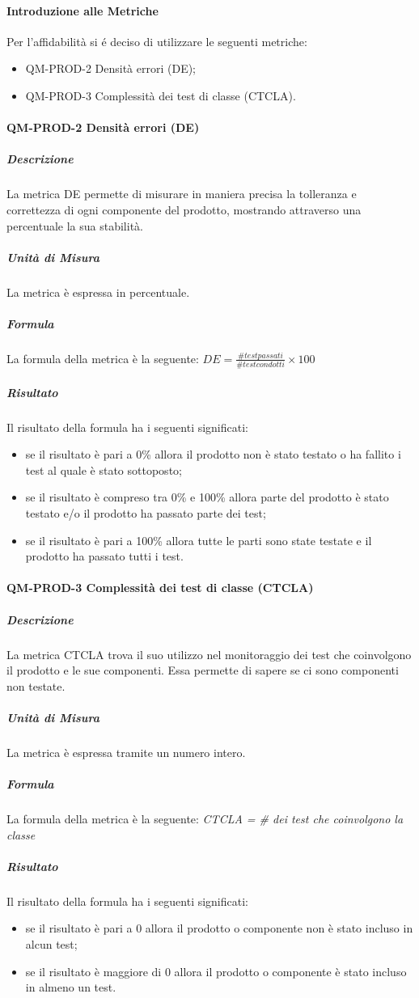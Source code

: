 		\paragraph{Introduzione alle Metriche}
			Per l'affidabilità si é deciso di utilizzare le seguenti metriche:
			\begin{itemize}
				\item QM-PROD-2 Densità errori (DE);
				\item QM-PROD-3 Complessità dei test di classe (CTCLA).
			\end{itemize}
		\paragraph{ QM-PROD-2 Densità errori (DE)}
			\subparagraph{Descrizione}
				La metrica DE permette di misurare in maniera precisa la tolleranza e correttezza di ogni componente del prodotto, mostrando attraverso una percentuale la sua stabilità.
			\subparagraph{Unità di Misura}
				La metrica è espressa in percentuale.
			\subparagraph{Formula}
				La formula della metrica è la seguente:
				\(DE = \frac{\# test passati}{\# test condotti}\times100\)
			\subparagraph{Risultato}
				Il risultato della formula ha i seguenti significati:
				\begin{itemize}
					\item se il risultato è pari a 0\% allora il prodotto non è stato testato o ha fallito i test al quale è stato sottoposto;
					\item se il risultato è compreso tra 0\% e 100\% allora parte del prodotto è stato testato e/o il prodotto ha passato parte dei test;
					\item se il risultato è pari a 100\% allora tutte le parti sono state testate e il prodotto ha passato tutti i test.
				\end{itemize}
		\paragraph{QM-PROD-3 Complessità dei test di classe (CTCLA)}
			\subparagraph{Descrizione}
				La metrica CTCLA trova il suo utilizzo nel monitoraggio dei test che coinvolgono il prodotto e le sue componenti. Essa permette di sapere se ci sono componenti non testate.
			\subparagraph{Unità di Misura}
				La metrica è espressa tramite un numero intero.
			\subparagraph{Formula}
				La formula della metrica è la seguente:
				\textit{CTCLA = \# dei test che coinvolgono la classe}
			\subparagraph{Risultato}
				Il risultato della formula ha i seguenti significati:
				\begin{itemize}
					\item se il risultato è pari a 0 allora il prodotto o componente non è stato incluso in alcun test;
					\item se il risultato è maggiore di 0 allora il prodotto o componente è stato incluso in almeno un test.
				\end{itemize}

